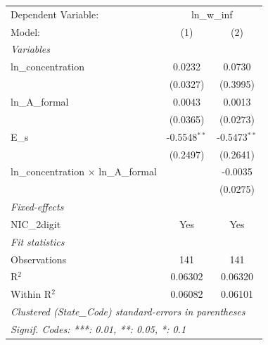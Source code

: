
\begingroup
\centering
\begin{tabular}{lcc}
   \tabularnewline \midrule \midrule
   Dependent Variable: & \multicolumn{2}{c}{ln\_w\_inf}\\
   Model:                                       & (1)            & (2)\\  
   \midrule
   \emph{Variables}\\
   ln\_concentration                            & 0.0232         & 0.0730\\   
                                                & (0.0327)       & (0.3995)\\   
   ln\_A\_formal                                & 0.0043         & 0.0013\\   
                                                & (0.0365)       & (0.0273)\\   
   E\_s                                         & -0.5548$^{**}$ & -0.5473$^{**}$\\   
                                                & (0.2497)       & (0.2641)\\   
   ln\_concentration $\times$ ln\_A\_formal     &                & -0.0035\\   
                                                &                & (0.0275)\\   
   \midrule
   \emph{Fixed-effects}\\
   NIC\_2digit                                  & Yes            & Yes\\  
   \midrule
   \emph{Fit statistics}\\
   Observations                                 & 141            & 141\\  
   R$^2$                                        & 0.06302        & 0.06320\\  
   Within R$^2$                                 & 0.06082        & 0.06101\\  
   \midrule \midrule
   \multicolumn{3}{l}{\emph{Clustered (State\_Code) standard-errors in parentheses}}\\
   \multicolumn{3}{l}{\emph{Signif. Codes: ***: 0.01, **: 0.05, *: 0.1}}\\
\end{tabular}
\par\endgroup


